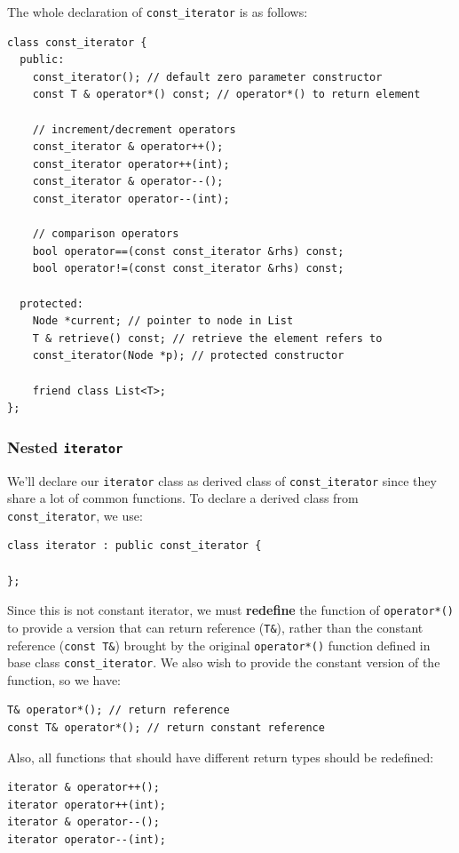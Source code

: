 \documentclass[11pt]{book}
\begin{document}
The whole declaration of \texttt{const\_iterator} is as follows:
\begin{verbatim}
class const_iterator {
  public:
    const_iterator(); // default zero parameter constructor
    const T & operator*() const; // operator*() to return element

    // increment/decrement operators
    const_iterator & operator++();
    const_iterator operator++(int);
    const_iterator & operator--();
    const_iterator operator--(int);

    // comparison operators
    bool operator==(const const_iterator &rhs) const;
    bool operator!=(const const_iterator &rhs) const;

  protected:
    Node *current; // pointer to node in List
    T & retrieve() const; // retrieve the element refers to
    const_iterator(Node *p); // protected constructor

    friend class List<T>;
};
\end{verbatim}
\subsubsection{Nested \texttt{iterator}}
\label{sec:orgdf013d3}
We'll declare our \texttt{iterator} class as derived class of \texttt{const\_iterator} since they share a lot of common functions. To declare a derived class from \texttt{const\_iterator}, we use:
\begin{verbatim}
class iterator : public const_iterator {

};
\end{verbatim}

Since this is not constant iterator, we must \textbf{redefine} the function of \texttt{operator*()} to provide a version that can return reference (\texttt{T\&}), rather than the constant reference (\texttt{const T\&}) brought by the original \texttt{operator*()} function defined in base class \texttt{const\_iterator}. We also wish to provide the constant version of the function, so we have:
\begin{verbatim}
T& operator*(); // return reference
const T& operator*(); // return constant reference
\end{verbatim}

Also, all functions that should have different return types should be redefined:
\begin{verbatim}
iterator & operator++();
iterator operator++(int);
iterator & operator--();
iterator operator--(int);
\end{verbatim}
\end{document}
